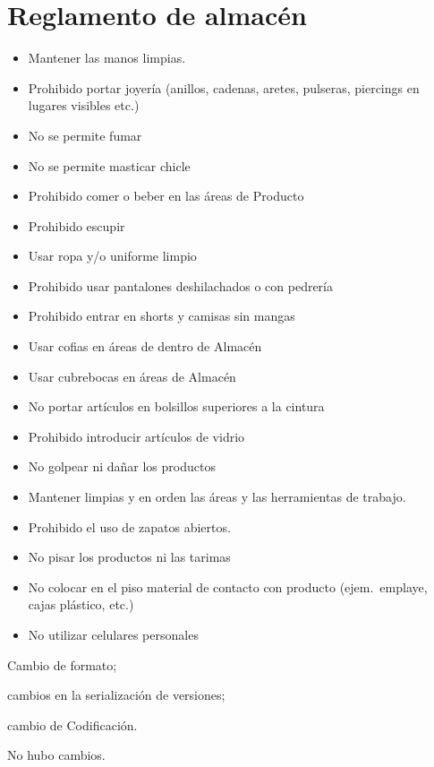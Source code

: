 \renewcommand{\Codigo}{BPD-PROG}
\renewcommand{\FechaPub}{2023-01}
\renewcommand{\Edit}{03}
\renewcommand{\Titulo}{Reglamento de almacén}
\section{\Titulo}

\begin{itemize}
	\item Mantener las manos limpias.
	\item Prohibido portar joyería (anillos, cadenas, aretes, pulseras, piercings en lugares visibles etc.)
	\item No se permite fumar
	\item No se permite masticar chicle
	\item Prohibido comer o beber en las áreas de Producto
	\item Prohibido escupir
	\item Usar ropa y/o uniforme limpio
	\item Prohibido usar pantalones deshilachados o con pedrería
	\item Prohibido entrar en shorts y camisas sin mangas
	\item Usar cofias en áreas de dentro de Almacén
	\item Usar cubrebocas en áreas de Almacén
	\item No portar artículos en bolsillos superiores a la cintura
	\item Prohibido introducir artículos de vidrio
	\item No golpear ni dañar los productos
	\item Mantener limpias y en orden las áreas y las herramientas de trabajo.
	\item Prohibido el uso de zapatos abiertos.
	\item No pisar los productos ni las tarimas
	\item No colocar en el piso material de contacto con producto (ejem.\ emplaye, cajas plástico, etc.)
	\item No utilizar celulares personales
\end{itemize}

\begin{changelog}[simple, sectioncmd=\subsection*]
	\begin{version}[v=2.1, date=2023-01, author=Pablo E. Alanis]
			\item Cambio de formato;
			\item cambios en la serialización de versiones;
			\item cambio de Codificación.
	\end{version}

	\begin{version}[v=1.6, date=2022-05, author=Alonso M.]
		\item No hubo cambios.
	\end{version}

\end{changelog}